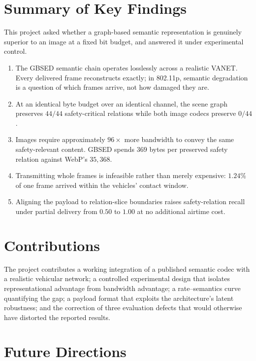 \documentclass{iutbscthesis}
\begin{document}
\section{Summary of Key Findings}

This project asked whether a graph-based semantic representation is genuinely
superior to an image at a fixed bit budget, and answered it under experimental
control.

\begin{enumerate}
    \item The GBSED semantic chain operates losslessly across a realistic
    VANET. Every delivered frame reconstructs exactly; in 802.11p, semantic
    degradation is a question of which frames arrive, not how damaged they are.
    \item At an identical byte budget over an identical channel, the scene
    graph preserves $44/44$ safety-critical relations while both image codecs
    preserve $0/44$.
    \item Images require approximately $96\times$ more bandwidth to convey the
    same safety-relevant content. GBSED spends $369$ bytes per preserved safety
    relation against WebP's $35{,}368$.
    \item Transmitting whole frames is infeasible rather than merely expensive:
    $1.24\%$ of one frame arrived within the vehicles' contact window.
    \item Aligning the payload to relation-slice boundaries raises
    safety-relation recall under partial delivery from $0.50$ to $1.00$ at no
    additional airtime cost.
\end{enumerate}

\section{Contributions}

The project contributes a working integration of a published semantic codec
with a realistic vehicular network; a controlled experimental design that
isolates representational advantage from bandwidth advantage; a
rate--semantics curve quantifying the gap; a payload format that exploits the
architecture's latent robustness; and the correction of three evaluation
defects that would otherwise have distorted the reported results.

\section{Future Directions}
\end{document}
